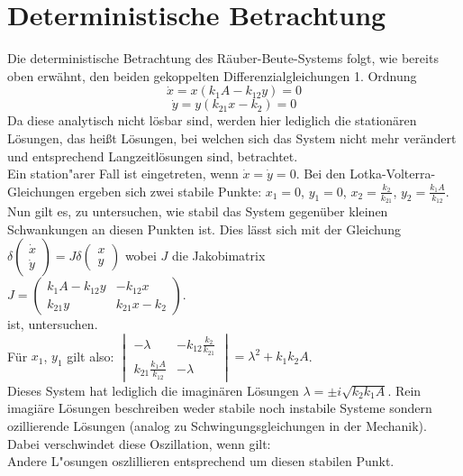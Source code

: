 \documentclass[11pt]{article}
\begin{document}
\section{Deterministische Betrachtung}
Die deterministische Betrachtung des Räuber-Beute-Systems folgt, wie bereits oben erwähnt, den beiden gekoppelten Differenzialgleichungen 1. Ordnung
$$\dot x=x(k_1 A-k_{12}y)=0$$
$$\dot y=y(k_{21}x-k_2)=0$$
Da diese analytisch nicht lösbar sind, werden hier lediglich die stationären Lösungen, das heißt Lösungen, bei welchen sich das System nicht mehr verändert und entsprechend Langzeitlösungen sind, betrachtet.\\
Ein station"arer Fall ist eingetreten, wenn  $\dot x=\dot y=0$. Bei den Lotka-Volterra-Gleichungen ergeben sich zwei stabile Punkte: 
 $x_1=0$, $y_1=0$, $x_2=\frac{k_2}{k_{21}}$, $y_2=\frac{k_1 A}{k_{12}}$.\\
Nun gilt es, zu untersuchen, wie stabil das System gegenüber kleinen Schwankungen an diesen Punkten ist. Dies lässt sich mit der Gleichung
$\delta \begin{pmatrix} \dot x \\ \dot y \end{pmatrix}=J\delta \begin{pmatrix} x \\ y \end{pmatrix}$ wobei $J$ die Jakobimatrix\\
$J=\begin{pmatrix} k_1A-k_{12}y & -k_{12}x \\ k_{21}y & k_{21}x-k_2 \end{pmatrix}$.\vspace{3mm} \\
ist, untersuchen.\\
Für $x_1$, $y_1$ gilt also:
$\begin{vmatrix} -\lambda & -k_{12}\frac{k_2}{k_21} \\ k_{21}\frac{k_1 A}{k_12} & -\lambda \end{vmatrix}=\lambda^2+k_1k_2A$.\\
Dieses System hat lediglich die imaginären Lösungen $\lambda=\pm i\sqrt{k_2k_1A}$. Rein imagiäre Lösungen beschreiben weder stabile noch instabile Systeme sondern ozillierende Lösungen (analog zu Schwingungsgleichungen in der Mechanik).\\
Dabei verschwindet diese Oszillation, wenn gilt:\\
Andere L"osungen oszlillieren entsprechend um diesen stabilen Punkt. 
\end{document}
